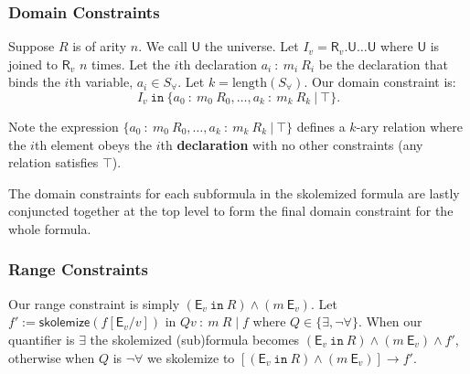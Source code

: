 \documentclass[10pt]{article}
\theoremstyle{definition}
\begin{document}
  \subsubsection*{Domain Constraints}

  Suppose $R$ is of arity $n$. We call $\textsf{U}$ the universe. Let $I_v = \textsf{R}_v.\textsf{U} \dots \textsf{U}$ where $\textsf{U}$ is joined to $\textsf{R}_v$ $n$ times. Let the $i$th declaration $a_i~:~m_i~R_i$ be the declaration that binds the $i$th variable, $a_i \in S_\forall$. Let $k = \text{length}(S_\forall)$. Our domain constraint is:
  $$I_v ~ \texttt{in} ~ \{a_0~:~m_0~R_0, \dots, a_k~:~m_k~R_k~\vert~\top\}.$$

  Note the expression $\{a_0~:~m_0~R_0, \dots, a_k~:~m_k~R_k~\vert~\top\}$ defines a $k$-ary relation where the $i$th element obeys the $i$th \textbf{declaration} with no other constraints (any relation satisfies $\top$).

  The domain constraints for each subformula in the skolemized formula are lastly conjuncted together at the top level to form the final domain constraint for the whole formula.



  \subsubsection*{Range Constraints}
  Our range constraint is simply $(\textsf{E}_v ~\texttt{in}~R)\land(m~\textsf{E}_v)$. Let $f' := \textsf{skolemize}(f[\textsf{E}_v / v])$ in $Qv~:~m~R \mid f$ where $Q \in \{\exists, \neg \forall\}$. When our quantifier is $\exists$ the skolemized (sub)formula becomes $(\textsf{E}_v ~\texttt{in}~R)\land(m~\textsf{E}_v) \land f'$, otherwise when $Q$ is $\neg \forall$ we skolemize to $[(\textsf{E}_v ~\texttt{in}~R)\land(m~\textsf{E}_v)] \to f'$.
\end{document}
